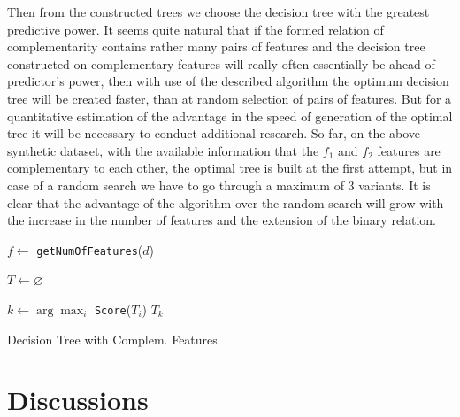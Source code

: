 \documentclass[conference]{IEEEtran}
\DeclarePairedDelimiter\abs{\lvert}{\rvert}
\let\emptyset\varnothing
\theoremstyle{definition}
\begin{document}
Then from the constructed trees we choose the decision tree with the greatest predictive power. It seems quite natural that if the formed relation of complementarity contains rather many pairs of features and the decision tree constructed on complementary features will really often essentially be ahead of predictor's power, then with use of the described algorithm the optimum decision tree will be created faster, than at random selection of pairs of features. But for a quantitative estimation of the advantage in the speed of generation of the optimal tree it will be necessary to conduct additional research. So far, on the above synthetic dataset, with the available information that the $f_1$ and $f_2$ features are complementary to each other, the optimal tree is built at the first attempt, but in case of a random search we have to go through a maximum of 3 variants. It is clear that the advantage of the algorithm over the random search will grow with the increase in the number of features and the extension of the binary relation.

\begin{algorithm}
\SetAlgoLined
{}
 $f \gets$ \texttt{getNumOfFeatures}($d$)\;
 
 
 $T \gets \emptyset$\;
 
 $k \gets \arg\max_i$ \texttt{Score}($T_i$)\;
 \Return $T_k$
 
 \caption{Decision Tree with Complem. Features}
\end{algorithm}

\section{Discussions}
\end{document}
